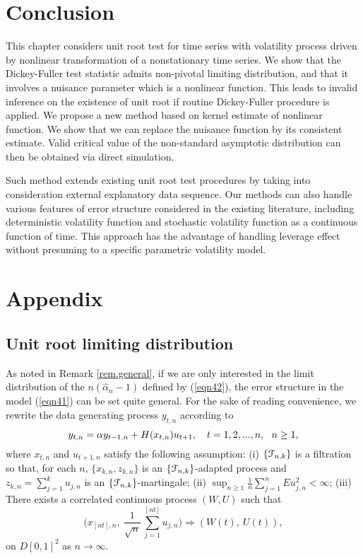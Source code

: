 \section{Conclusion} 
This chapter considers unit root test for time series with volatility process driven by nonlinear transformation of a nonstationary time series. We show that the Dickey-Fuller test statistic admits non-pivotal limiting distribution, and that it involves a nuisance parameter which is a nonlinear function. This leads to invalid inference on the existence of unit root if routine Dickey-Fuller procedure is applied. We propose a new method based on kernel estimate of nonlinear function. We show that we can replace the nuisance function by its consistent estimate. Valid critical value of the non-standard asymptotic distribution can then be obtained via direct simulation.

Such method extends existing unit root test procedures by taking into consideration external explanatory data sequence. Our methods can also handle various features of error structure considered in the existing literature, including deterministic volatility function and stochastic volatility function as a continuous function of time. This approach has the advantage of handling leverage effect without presuming to a specific parametric volatility model.


\section{Appendix} 




\subsection{Unit root limiting distribution} 
As noted in Remark \ref{rem.general}, if we are only interested in the limit distribution of the $n(\widehat \alpha_n - 1)$ defined by (\ref{eqn42}), the error structure in the model (\ref{eqn41}) can be set quite general.
For the sake of  reading convenience, we rewrite the data generating process  $y_{t,n}$  according to
\begin{equation} y_{t,n} = \alpha y_{t-1,n} + H(x_{t,n}) u_{t+1},
\quad t=1,2,...,n,\ \ n\ge 1, \la {77}\end{equation} where $x_{t,n}$ and $u_{t+1, n}$ satisfy the following assumption: (i) $\{{\cal F}_{n,k}\}  $ is  a filtration
so that, for each $n$, $\{x_{k,n}, z_{k,n}\}$ is an $\{{\cal F}_{n,k}\}$-adapted process and $z_{k,n}=\sum_{j=1}^ku_{j,n}$ is an $\{{\cal F}_{n,k}\}$-martingale; (ii) $\sup_{n\ge 1}\frac 1n \sum_{j=1}^nEu_{j,n}^2<\infty$; (iii)
 There exists    a correlated continuous process $(W,U)$ such that
\begin{equation}
\Big(x_{[nt],n},\ \frac 1{\sqrt n}\,
 \sum_{j=1}^{[nt]}u_{j,n}\Big)
\Rightarrow (W(t),\ U(t)),
\label{tt1}
\end{equation}
on $D[0,1]^2$ as $n\rightarrow \infty.$


